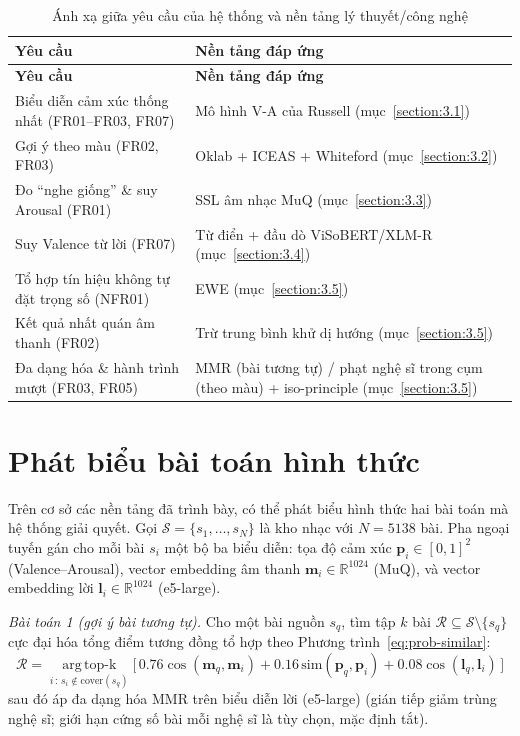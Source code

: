 \documentclass[../DoAn.tex]{subfiles}
\begin{document}
\begin{longtable}{|p{5.2cm}|p{8.0cm}|}
\caption{Ánh xạ giữa yêu cầu của hệ thống và nền tảng lý thuyết/công nghệ}\label{table:req2found}\\
\hline
\textbf{Yêu cầu} & \textbf{Nền tảng đáp ứng} \\
\hline
\endfirsthead
\hline
\textbf{Yêu cầu} & \textbf{Nền tảng đáp ứng} \\
\hline
\endhead
Biểu diễn cảm xúc thống nhất (FR01--FR03, FR07) & Mô hình V-A của Russell (mục~\ref{section:3.1}) \\
\hline
Gợi ý theo màu (FR02, FR03) & Oklab + ICEAS + Whiteford (mục~\ref{section:3.2}) \\
\hline
Đo ``nghe giống'' \& suy Arousal (FR01) & SSL âm nhạc MuQ (mục~\ref{section:3.3}) \\
\hline
Suy Valence từ lời (FR07) & Từ điển + đầu dò ViSoBERT/XLM-R (mục~\ref{section:3.4}) \\
\hline
Tổ hợp tín hiệu không tự đặt trọng số (NFR01) & EWE (mục~\ref{section:3.5}) \\
\hline
Kết quả nhất quán âm thanh (FR02) & Trừ trung bình khử dị hướng (mục~\ref{section:3.5}) \\
\hline
Đa dạng hóa \& hành trình mượt (FR03, FR05) & MMR (bài tương tự) / phạt nghệ sĩ trong cụm (theo màu) + iso-principle (mục~\ref{section:3.5}) \\
\hline
\end{longtable}

\section{Phát biểu bài toán hình thức}
\label{section:3.8}
Trên cơ sở các nền tảng đã trình bày, có thể phát biểu hình thức hai bài toán mà hệ thống giải quyết. Gọi $\mathcal{S} = \{s_1, \dots, s_N\}$ là kho nhạc với $N = 5138$ bài. Pha ngoại tuyến gán cho mỗi bài $s_i$ một bộ ba biểu diễn: tọa độ cảm xúc $\mathbf{p}_i \in [0,1]^2$ (Valence--Arousal), vector embedding âm thanh $\mathbf{m}_i \in \mathbb{R}^{1024}$ (MuQ), và vector embedding lời $\mathbf{l}_i \in \mathbb{R}^{1024}$ (e5-large).

\textit{Bài toán 1 (gợi ý bài tương tự).} Cho một bài nguồn $s_q$, tìm tập $k$ bài $\mathcal{R} \subseteq \mathcal{S} \setminus \{s_q\}$ cực đại hóa tổng điểm tương đồng tổ hợp theo Phương trình~\eqref{eq:prob-similar}:
\begin{equation}\label{eq:prob-similar}
  \mathcal{R} = \operatorname*{arg\,top\text{-}k}_{i \,:\, s_i \notin \text{cover}(s_q)} \big[\,0.76\cos(\mathbf{m}_q, \mathbf{m}_i) + 0.16\,\text{sim}(\mathbf{p}_q, \mathbf{p}_i) + 0.08\cos(\mathbf{l}_q, \mathbf{l}_i)\,\big]
\end{equation}
sau đó áp đa dạng hóa MMR trên biểu diễn lời (e5-large) (gián tiếp giảm trùng nghệ sĩ; giới hạn cứng số bài mỗi nghệ sĩ là tùy chọn, mặc định tắt).
\end{document}
